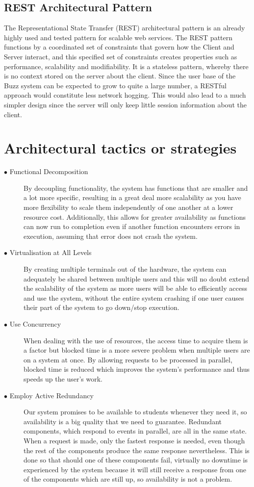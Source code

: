 \documentclass[12pt]{article}
\begin{document}
\subsection{REST Architectural Pattern}
The Representational State Transfer (REST) architectural pattern is an already highly used and tested pattern for scalable web services.
The REST pattern functions by a coordinated set of constraints that govern how the Client and Server interact, and this specified set of constraints creates properties such as performance, scalability and modifiability. 
It is a stateless pattern, whereby there is no context stored on the server about the client.
Since the user base of the Buzz system can be expected to grow to quite a large number, a RESTful approach would constitute less network hogging. This would also lead to a much simpler design since the server will only keep little session information about the client.

\section{Architectural tactics or strategies}
\begin{description}
  \item[$\bullet$ Functional Decomposition]
  By decoupling functionality, the system has functions that are smaller and a lot more specific, resulting in a great deal more scalability as you have more flexibility to scale them independently of one another at a lower resource cost. Additionally, this allows for greater availability as functions can now run to completion even if another function encounters errors in execution, assuming that error does not crash the system.
  \item[$\bullet$ Virtualisation at All Levels]
  By creating multiple terminals out of the hardware, the system can adequately be shared between multiple users and this will no doubt extend the scalability of the system as more users will be able to efficiently access and use the system, without the entire system crashing if one user causes their part of the system to go down/stop execution.
  \item[$\bullet$ Use Concurrency]
  When dealing with the use of resources, the access time to acquire them is a factor but blocked time is a more severe problem when multiple users are on a system at once. By allowing requests to be processed in parallel, blocked time is reduced which improves the system's performance and thus speeds up the user's work.
  \item[$\bullet$ Employ Active Redundancy]
  Our system promises to be available to students whenever they need it, so availability is a big quality that we need to guarantee.
  Redundant components, which respond to events in parallel, are all in the same state. When a request is made, only the fastest response is needed, even though the rest of the components produce the same response nevertheless. This is done so that should one of these components fail, virtually no downtime is experienced by the system because it will still receive a response from one of the components which are still up, so availability is not a problem. 
\end{description}
\end{document}
